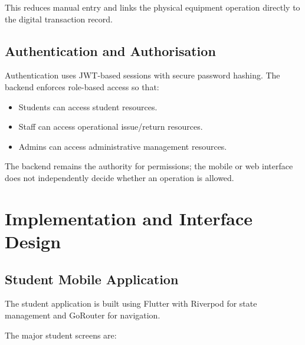 \documentclass[12pt,a4paper,oneside]{report}
\begin{document}
This reduces manual entry and links the physical equipment operation directly to the digital transaction record.

\section{Authentication and Authorisation}

Authentication uses JWT-based sessions with secure password hashing. The backend enforces role-based access so that:

\begin{itemize}
    \item Students can access student resources.
    \item Staff can access operational issue/return resources.
    \item Admins can access administrative management resources.
\end{itemize}

The backend remains the authority for permissions; the mobile or web interface does not independently decide whether an operation is allowed.

\chapter{Implementation and Interface Design}

\section{Student Mobile Application}

The student application is built using Flutter with Riverpod for state management and GoRouter for navigation.

The major student screens are:
\end{document}
